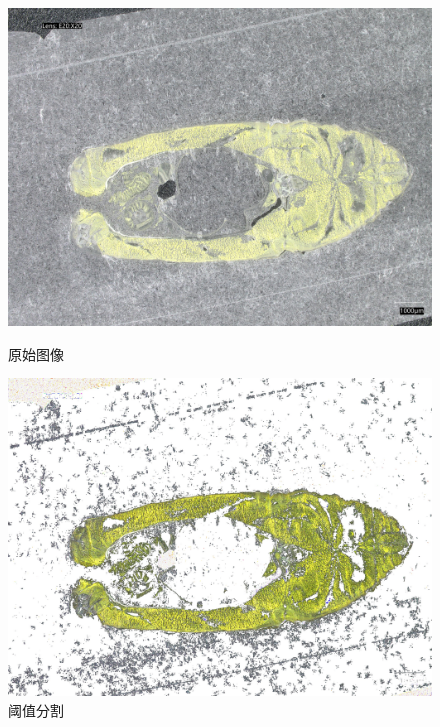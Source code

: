 \begin{figure}[H]
    \centering
    \begin{minipage}{0.45\textwidth}
        \centering
        \includegraphics[width=\textwidth]{./fig/model2/origin20240205_161427.jpg}
        \caption{原始图像}
        \label{fig:origin}
    \end{minipage}
    \begin{minipage}{0.45\textwidth}
        \centering
        \includegraphics[width=\textwidth]{./fig/model2/yellow20240205_161427.jpg}
        \caption{阈值分割}
        \label{fig:yellow}
    \end{minipage}
\end{figure}

